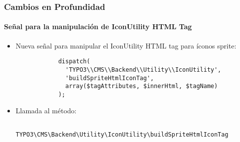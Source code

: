 \begin{frame}[fragile]
	\frametitle{Cambios en Profundidad}
	\framesubtitle{Señal para la manipulación de IconUtility HTML Tag}

	\lstset{
		basicstyle=\tiny\ttfamily
	}

	\begin{itemize}

		\item Nueva señal para manipular el IconUtility HTML tag para íconos sprite:

		\begin{lstlisting}
			dispatch(
			  'TYPO3\\CMS\\Backend\\Utility\\IconUtility',
			  'buildSpriteHtmlIconTag',
			  array($tagAttributes, $innerHtml, $tagName)
			);
		\end{lstlisting}

		\item Llamada al método:

		\begin{lstlisting}
			TYPO3\CMS\Backend\Utility\IconUtility\buildSpriteHtmlIconTag
		\end{lstlisting}

	\end{itemize}

\end{frame}


